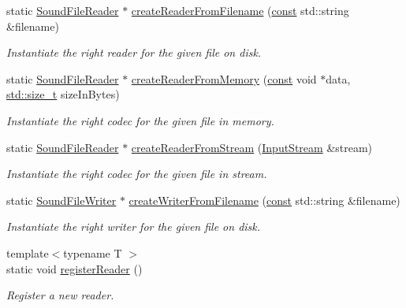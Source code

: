\begin{DoxyCompactItemize}
static \hyperlink{classsf_1_1_sound_file_reader}{Sound\-File\-Reader} $\ast$ \hyperlink{classsf_1_1_sound_file_factory_af0a87110e0b8a77aada17b22a016c066}{create\-Reader\-From\-Filename} (\hyperlink{term__entry_8h_a57bd63ce7f9a353488880e3de6692d5a}{const} std\-::string \&filename)
\begin{DoxyCompactList}\small\item\em Instantiate the right reader for the given file on disk. \end{DoxyCompactList}\item 
static \hyperlink{classsf_1_1_sound_file_reader}{Sound\-File\-Reader} $\ast$ \hyperlink{classsf_1_1_sound_file_factory_aee7a0ff1eace98d5325eaadc7d26d50c}{create\-Reader\-From\-Memory} (\hyperlink{term__entry_8h_a57bd63ce7f9a353488880e3de6692d5a}{const} void $\ast$data, \hyperlink{nc__alloc_8h_a7b60c5629e55e8ec87a4547dd4abced4}{std\-::size\-\_\-t} size\-In\-Bytes)
\begin{DoxyCompactList}\small\item\em Instantiate the right codec for the given file in memory. \end{DoxyCompactList}\item 
static \hyperlink{classsf_1_1_sound_file_reader}{Sound\-File\-Reader} $\ast$ \hyperlink{classsf_1_1_sound_file_factory_a8d4b1f225b72a128ddba3be22f7ba5a2}{create\-Reader\-From\-Stream} (\hyperlink{classsf_1_1_input_stream}{Input\-Stream} \&stream)
\begin{DoxyCompactList}\small\item\em Instantiate the right codec for the given file in stream. \end{DoxyCompactList}\item 
static \hyperlink{classsf_1_1_sound_file_writer}{Sound\-File\-Writer} $\ast$ \hyperlink{classsf_1_1_sound_file_factory_a0702eb2e8a4a171ba80c7fbd04c4defc}{create\-Writer\-From\-Filename} (\hyperlink{term__entry_8h_a57bd63ce7f9a353488880e3de6692d5a}{const} std\-::string \&filename)
\begin{DoxyCompactList}\small\item\em Instantiate the right writer for the given file on disk. \end{DoxyCompactList}\item 
{\footnotesize template$<$typename T $>$ }\\static void \hyperlink{classsf_1_1_sound_file_factory_aeee396bfdbb6ac24c57e5c73c30ec105}{register\-Reader} ()
\begin{DoxyCompactList}\small\item\em Register a new reader. \end{DoxyCompactList}\item 

\end{DoxyCompactItemize}
